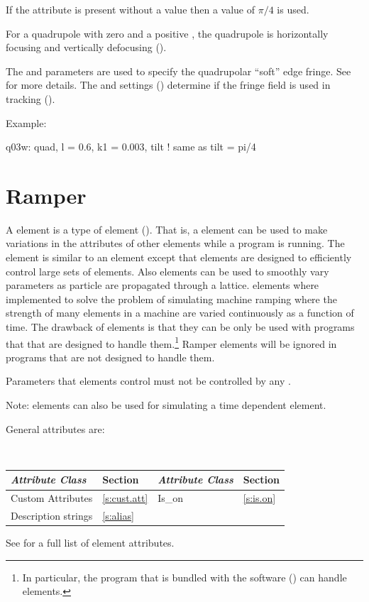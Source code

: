 {
If the  attribute is present without a value then a value of $\pi/4$
is used.

For a quadrupole with zero  and a positive , the
quadrupole is horizontally focusing and vertically defocusing
().

The  and  parameters are used to specify the
quadrupolar ``soft'' edge fringe. See  for more details.
The  and  settings ()
determine if the fringe field is used in tracking ().

Example:
\begin{example}
  q03w: quad, l = 0.6, k1 = 0.003, tilt  ! same as tilt = pi/4
\end{example}

\section{Ramper}
\label{s:ramper}

A  element is a type of  element (). That is, a
 element can be used to make variations in the attributes of other elements while a
program is running. The  element is similar to an  element except that
 elements are designed to efficiently control large sets of elements. Also 
elements can be used to smoothly vary parameters as particle are propagated through a
lattice.  elements where implemented to solve the problem of simulating machine ramping
where the strength of many elements in a machine are varied continuously as a function of time. The
drawback of  elements is that they can be only be used with programs that that are
designed to handle them.\footnote 
  {
In particular, the  program that is bundled with the \bmad software
() can handle  elements.
  }
Ramper elements will be ignored in programs that are not designed to handle them.

Parameters that  elements control must not be controlled by any .

Note:  elements can also be used for simulating a time dependent element.

General  attributes are:
\begin{center}
\tt
\begin{tabular}{llll} \toprule
  {\sl Attribute Class}      & Section           & {\sl Attribute Class}      & Section         \\ \midrule
  Custom Attributes          & \ref{s:cust.att}  & Is_on                      & \ref{s:is.on}   \\
  Description strings        & \ref{s:alias}     &                            &                 \\ 
  \bottomrule
\end{tabular}
\end{center}
\toffset
See  for a full list of element attributes.

}
